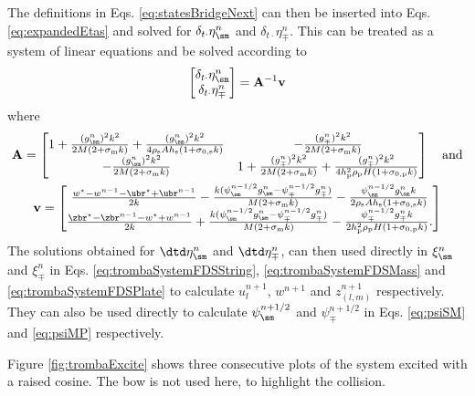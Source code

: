 The definitions in Eqs. \eqref{eq:statesBridgeNext} can then be inserted into Eqs. \eqref{eq:expandedEtas} and solved for $\delta_{t\cdot}\eta_\sm^n$ and $\delta_{t\cdot}\eta_\mp^n$. This can be treated as a system of linear equations and be solved according to
\begin{equation}
    \begin{bmatrix}
        \delta_{t\cdot}\eta_\sm^n\\
        \delta_{t\cdot}\eta_\mp^n
    \end{bmatrix}
    = 
    \mathbf{A}^{-1}\mathbf{v}
\end{equation}
where
\begin{equation}
\begin{gathered}
\mathbf{A} = 
    \begin{bmatrix}
        1 + \frac{(g_\sm^n)^2k^2}{2M(2+\sigma_\text{m}k)} + \frac{(g_\sm^n)^2k^2}{4\rho_\text{s}Ah_\text{s}(1+\sigma_{0,\text{s}}k)} & -\frac{(g_\mp^n)^2k^2}{2M(2+\sigma_\text{m}k)} \\
        -\frac{(g_\sm^n)^2k^2}{2M(2+\sigma_\text{m}k)} & 1+\frac{(g_\mp^n)^2k^2}{2M(2+\sigma_\text{m}k)}+\frac{(g_\mp^n)^2k^2}{4h_\text{p}^2\rho_\text{p}H(1+\sigma_{0,\text{p}}k)}
    \end{bmatrix}
    \quad \text{and}\\
    \mathbf{v} = 
    \begin{bmatrix}
        \frac{w^\star-w^{n-1}-\ubr^\star+\ubr^{n-1}}{2k} - \frac{k(\psi_\sm^{n-1/2}g_\sm^n-\psi_\mp^{n-1/2}g_\mp^n)}{M(2+\sigma_\text{m}k)}-\frac{\psi_\sm^{n-1/2}g_\sm^nk}{2\rho_\text{s}Ah_\text{s}(1+\sigma_{0,\text{s}}k)}\\
        \frac{\zbr^\star-\zbr^{n-1}-w^\star+w^{n-1}}{2k}+\frac{k(\psi_\sm^{n-1/2}g_\sm^n-\psi_\mp^{n-1/2}g_\mp^n)}{M(2+\sigma_\text{m}k)}-\frac{\psi_\mp^{n-1/2}g_\mp^nk}{2h_\text{p}^2\rho_\text{p}H(1+\sigma_{0,\text{p}}k)}.
    \end{bmatrix}
    \nonumber
\end{gathered}
\end{equation}
The solutions obtained for $\dtd \eta_\sm^n$ and $\dtd \eta_\mp^n$, can then used directly in $\xi_\sm^n$ and $\xi_\mp^n$ in Eqs. \eqref{eq:trombaSystemFDSString}, \eqref{eq:trombaSystemFDSMass} and \eqref{eq:trombaSystemFDSPlate} to calculate $u_l^{n+1}$, $w^{n+1}$ and $z_{(l,m)}^{n+1}$ respectively. They can also be used directly to calculate $\psi^{n+1/2}_\sm$ and $\psi^{n+1/2}_\mp$ in Eqs. \eqref{eq:psiSM} and \eqref{eq:psiMP} respectively.

Figure \ref{fig:trombaExcite} shows three consecutive plots of the system excited with a raised cosine. The bow is not used here, to highlight the collision.

